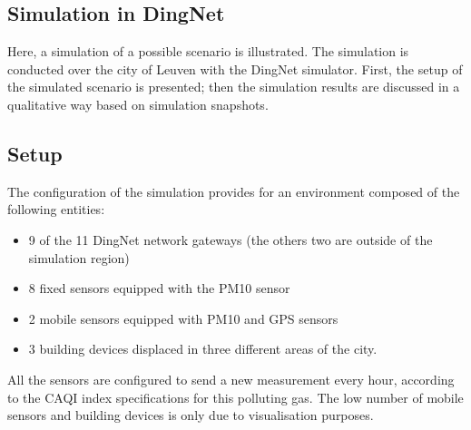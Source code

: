 

\subsection{Simulation in DingNet}
Here, a simulation of a possible scenario is illustrated. 
The simulation is conducted over the city of Leuven with the DingNet simulator.
First, the setup of the simulated scenario is presented; then the simulation results are discussed in a qualitative way based on simulation snapshots.
\subsection*{Setup}
The configuration of the simulation provides for an environment composed of the following entities:
\begin{itemize}
    \item 9 of the 11 DingNet network gateways (the others two are outside of the simulation region)
    \item 8 fixed sensors equipped with the PM10 sensor
    \item 2 mobile sensors equipped with PM10 and GPS sensors
    \item 3 building devices displaced in three different areas of the city.
\end{itemize}
All the sensors are configured to send a new measurement every hour, according to the CAQI index specifications for this polluting gas.
The low number of mobile sensors and building devices is only due to visualisation purposes. 

